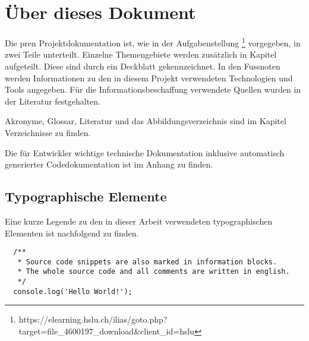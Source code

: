  \section*{Über dieses Dokument}

  Die \acrshort{pren} Projektdokumentation ist, wie in der Aufgabenstellung \footnote{
    https://elearning.hslu.ch/ilias/goto.php?target=file\_4600197\_download\&client\_id=hslu
  } vorgegeben, in zwei Teile unterteilt.
  Einzelne Themengebiete werden zusätzlich in Kapitel aufgeteilt. Diese sind durch
  ein Deckblatt gekennzeichnet.
  In den Fussnoten werden Informationen zu den in diesem Projekt verwendeten
  Technologien und Tools angegeben.
  Für die Informationsbeschaffung verwendete Quellen wurden in der Literatur
  festgehalten.

  Akronyme, Glossar, Literatur und das Abbildungsverzeichnis sind im
  Kapitel Verzeichnisse zu finden.

  Die für Entwickler wichtige technische Dokumentation inklusive
  automatisch generierter Codedokumentation ist im Anhang
  zu finden.

  \subsection*{Typographische Elemente}

  Eine kurze Legende zu den in dieser Arbeit verwendeten typographischen Elementen
  ist nachfolgend zu finden.


  \begin{verbatim}
  /**
   * Source code snippets are also marked in information blocks.
   * The whole source code and all comments are written in english.
   */
  console.log('Hello World!');
  \end{verbatim}
